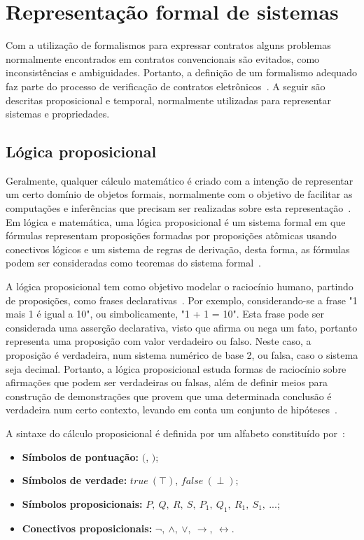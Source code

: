 \section{Representação formal de sistemas}

Com a utilização de formalismos para expressar contratos alguns problemas normalmente encontrados em contratos convencionais são evitados, como inconsistências e ambiguidades. Portanto, a definição de um formalismo adequado faz parte do processo de verificação de contratos eletrônicos~\cite{fenech2008conflict}. A seguir são descritas proposicional e temporal, normalmente utilizadas para representar sistemas e propriedades.

\subsection{Lógica proposicional}
   
Geralmente, qualquer cálculo matemático é criado com a intenção de representar um certo domínio de objetos formais, normalmente com o objetivo de facilitar as computações e inferências que precisam ser realizadas sobre esta representação~\cite{bedregal2002logica}. Em lógica e matemática, uma lógica proposicional é um sistema formal em que fórmulas representam proposições formadas por proposições atômicas usando conectivos lógicos e um sistema de regras de derivação, desta forma, as fórmulas podem ser consideradas como teoremas do sistema formal~\cite{bedregal2002logica}.

A lógica proposicional tem como objetivo modelar o raciocínio humano, partindo de proposições, como frases declarativas~\cite{bedregal2002logica}. Por exemplo, considerando-se a frase "1 mais 1 é igual a 10", ou simbolicamente, "1 + 1 = 10". Esta frase pode ser considerada uma asserção declarativa, visto que afirma ou nega um fato, portanto representa uma proposição com valor verdadeiro ou falso. Neste caso, a proposição é verdadeira, num sistema numérico de base 2, ou falsa, caso o sistema seja decimal. Portanto, a lógica proposicional estuda formas de raciocínio sobre afirmações que podem ser verdadeiras ou falsas, além de definir meios para construção de demonstrações que provem que uma determinada conclusão é verdadeira num certo contexto, levando em conta um conjunto de hipóteses~\cite{bedregal2002logica}.

A sintaxe do cálculo proposicional é definida por um alfabeto constituído por~\cite{souza2017logica}:
\begin{itemize}
	\item \textbf{Símbolos de pontuação:} $($, $)$;
	\item \textbf{Símbolos de verdade:} $true~(\top)$, $false~(\perp)$;
	\item \textbf{Símbolos proposicionais:} $P,~Q,~R,~S,~P_{1},~Q_{1},~R_{1},~S_{1},~... $;
	\item \textbf{Conectivos proposicionais:} $\neg,~\wedge,~\vee,~\rightarrow,~\leftrightarrow$.
\end{itemize}

